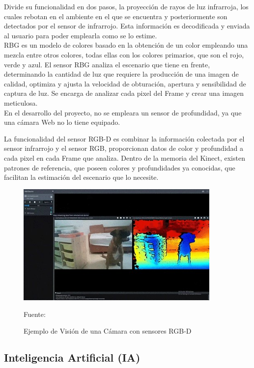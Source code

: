 Divide su funcionalidad en dos pasos, la proyección de rayos de luz infrarroja, los cuales rebotan en el ambiente en el que se encuentra y posteriormente son detectados por el sensor de infrarrojo. Esta información es decodificada y enviada al usuario para poder emplearla como se lo estime.
\\
RBG es un modelo de colores basado en la obtención de un color empleando una mezcla entre otros colores, todas ellas con los colores primarios, que son el rojo, verde y azul. 
El sensor RBG analiza el escenario que tiene en frente, determinando la cantidad de luz que requiere la producción de una imagen de calidad, optimiza y ajusta la velocidad de obturación, apertura y sensibilidad de captura de luz. 
Se encarga de analizar cada pixel del Frame y crear una imagen meticulosa.
\\
En el desarrollo del proyecto, no se empleara un sensor de profundidad, ya que una cámara Web no lo tiene equipado.

La funcionalidad del sensor RGB-D es combinar la información colectada por el sensor infrarrojo y el sensor RGB, proporcionan datos de color y profundidad a cada pixel en cada Frame que analiza. Dentro de la memoria del Kinect, existen patrones de referencia, que poseen colores y profundidades ya conocidas, que facilitan la estimación del escenario que lo necesite\cite{litomisky2012consumer}.  
\begin{figure}[t!]
	\centering
	\includegraphics[width=10cm,height=6cm,]{./Images/RGBandDepth.jpg}
	\caption{Ejemplo de Visión de una Cámara con sensores RGB-D}
	\footnotesize Fuente: \cite{RGBandDepth}
	\label{RGBandDepth}
\end{figure}


\subsection{Inteligencia Artificial (IA)}

